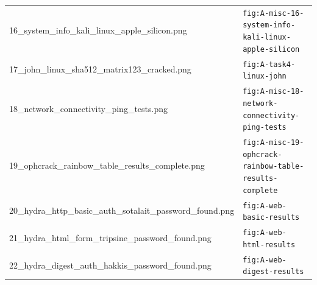 \begin{longtable}{@{}p{6cm}p{8cm}@{}}
16\_system\_info\_kali\_linux\_apple\_silicon.png & \texttt{fig:A-misc-16-system-info-kali-linux-apple-silicon} \\
17\_john\_linux\_sha512\_matrix123\_cracked.png & \texttt{fig:A-task4-linux-john} \\
18\_network\_connectivity\_ping\_tests.png & \texttt{fig:A-misc-18-network-connectivity-ping-tests} \\
19\_ophcrack\_rainbow\_table\_results\_complete.png & \texttt{fig:A-misc-19-ophcrack-rainbow-table-results-complete} \\
20\_hydra\_http\_basic\_auth\_sotalait\_password\_found.png & \texttt{fig:A-web-basic-results} \\
21\_hydra\_html\_form\_tripsine\_password\_found.png & \texttt{fig:A-web-html-results} \\
22\_hydra\_digest\_auth\_hakkis\_password\_found.png & \texttt{fig:A-web-digest-results} \\
\bottomrule
\end{longtable}